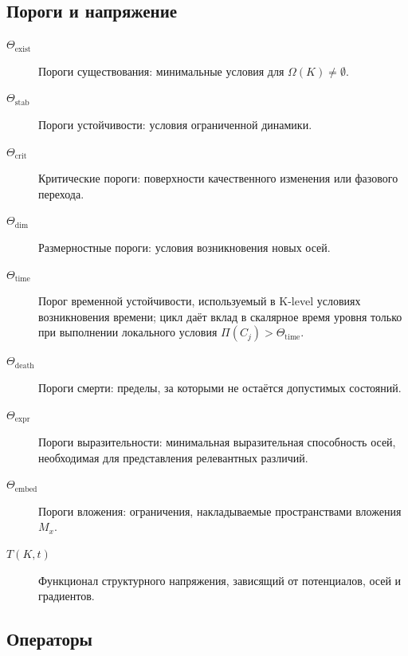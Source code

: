 \subsection{Пороги и напряжение}

\begin{description}
  \item[\(\Theta_{\mathrm{exist}}\)] Пороги существования:
        минимальные условия для \(\Omega(K)\neq\emptyset\).
  \item[\(\Theta_{\mathrm{stab}}\)] Пороги устойчивости:
        условия ограниченной динамики.
  \item[\(\Theta_{\mathrm{crit}}\)] Критические пороги:
        поверхности качественного изменения или фазового перехода.
  \item[\(\Theta_{\mathrm{dim}}\)] Размерностные пороги:
        условия возникновения новых осей.
  \item[\(\Theta_{\mathrm{time}}\)] Порог временной устойчивости, используемый
        в K-level условиях возникновения времени; цикл даёт вклад в скалярное
        время уровня только при выполнении локального условия
        \(\Pi(C_j)>\Theta_{\mathrm{time}}\).
  \item[\(\Theta_{\mathrm{death}}\)] Пороги смерти:
        пределы, за которыми не остаётся допустимых состояний.
  \item[\(\Theta_{\mathrm{expr}}\)] Пороги выразительности:
        минимальная выразительная способность осей, необходимая для
        представления релевантных различий.
  \item[\(\Theta_{\mathrm{embed}}\)] Пороги вложения:
        ограничения, накладываемые пространствами вложения \(M_x\).
  \item[\(T(K,t)\)] Функционал структурного напряжения, зависящий от
        потенциалов, осей и градиентов.
\end{description}

\subsection{Операторы}

